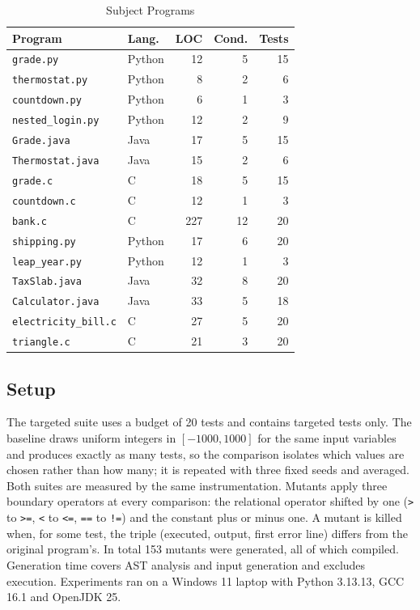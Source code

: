\documentclass[conference]{IEEEtran}
\begin{document}
\begin{table}[t]
\caption{Subject Programs}\label{tab:subjects}
\centering\footnotesize
\begin{tabular}{@{}llrrr@{}}
\toprule
Program & Lang. & LOC & Cond. & Tests \\
\midrule
\texttt{grade.py} & Python & 12 & 5 & 15 \\
\texttt{thermostat.py} & Python & 8 & 2 & 6 \\
\texttt{countdown.py} & Python & 6 & 1 & 3 \\
\texttt{nested\_login.py} & Python & 12 & 2 & 9 \\
\texttt{Grade.java} & Java & 17 & 5 & 15 \\
\texttt{Thermostat.java} & Java & 15 & 2 & 6 \\
\texttt{grade.c} & C & 18 & 5 & 15 \\
\texttt{countdown.c} & C & 12 & 1 & 3 \\
\texttt{bank.c} & C & 227 & 12 & 20 \\
\texttt{shipping.py} & Python & 17 & 6 & 20 \\
\texttt{leap\_year.py} & Python & 12 & 1 & 3 \\
\texttt{TaxSlab.java} & Java & 32 & 8 & 20 \\
\texttt{Calculator.java} & Java & 33 & 5 & 18 \\
\texttt{electricity\_bill.c} & C & 27 & 5 & 20 \\
\texttt{triangle.c} & C & 21 & 3 & 20 \\
\bottomrule
\end{tabular}
\end{table}

\subsection{Setup}
The targeted suite uses a budget of 20 tests and contains targeted tests only. The baseline draws uniform
integers in $[-1000, 1000]$ for the same input variables and produces exactly as many tests, so the comparison
isolates which values are chosen rather than how many; it is repeated with three fixed seeds and averaged. Both
suites are measured by the same instrumentation. Mutants apply three boundary operators at every comparison: the
relational operator shifted by one (\texttt{>} to \texttt{>=}, \texttt{<} to \texttt{<=}, \texttt{==} to
\texttt{!=}) and the constant plus or minus one. A mutant is killed when, for some test, the triple (executed,
output, first error line) differs from the original program's. In total 153 mutants were
generated, all of which compiled. Generation time covers AST analysis and input generation and excludes execution.
Experiments ran on a Windows 11 laptop with Python 3.13.13, GCC 16.1 and OpenJDK 25.
\end{document}
